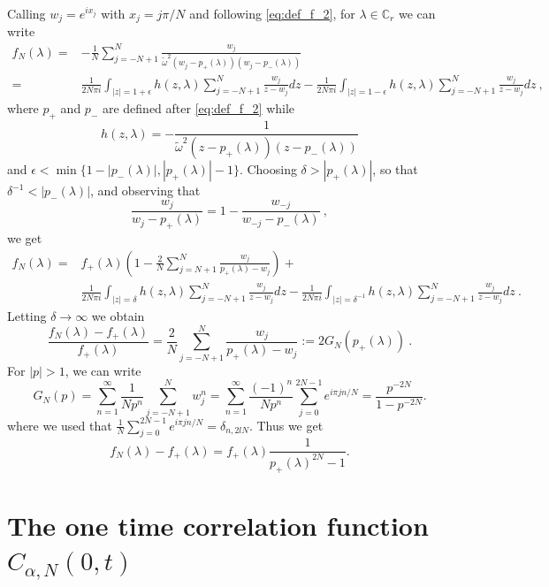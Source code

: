 \documentclass[11pt]{article}
\numberwithin{equation}{section}
\numberwithin{theorem}{section}
\newcommand{\matht}[1]{\texorpdfstring{#1}{}}
\def\tilde#1{\widetilde{#1}}
\begin{document}
Calling $w_j=e^{ix_j}$ with $x_j=j\pi/N$ and following \eqref{eq:def_f_2}, for $\lambda\in\mathds C_r$ we can write
\[
\begin{aligned}
f_N(\lambda)=&-\frac{1}{N}\sum_{j=-N+1}^N
\frac{w_j}{\tilde \omega^2(w_j-p_+(\lambda))(w_j-p_-(\lambda))}\\
=&\frac 1{2N\pi i}\int_{|z|=1+\epsilon}h(z,\lambda)\sum_{j=-N+1}^N
\frac{w_j}{z-w_j}dz-\frac 1{2 N \pi
i}\int_{|z|=1-\epsilon}h(z,\lambda)\sum_{j=-N+1}^N
\frac{w_j}{z-w_j}dz\ ,
\end{aligned}
\]
where $p_+$ and $p_-$ are defined after \eqref{eq:def_f_2} while
\[
h(z,\lambda)=-\frac{1}{\tilde \omega^2(z-p_+(\lambda))(z-p_-(\lambda))}
\]
and $\epsilon<\min\{1-|p_-(\lambda)|,|p_+(\lambda)|-1\}$. Choosing $\delta>|p_+(\lambda)|$, so that
$\delta^{-1}<|p_-(\lambda)|$, and observing that
\[
  \frac{w_j}{w_j-p_+(\lambda)} =1-\frac{w_{-j}}{w_{-j}-p_-(\lambda)
  }\ ,
\]
we get
\[
 \begin{aligned}
 f_N(\lambda)=&f_+(\lambda)\left(1 -
\frac 2N\sum_{j=N+1}^N \frac{w_j}{p_+(\lambda) - w_j }
\right )+\\
&\frac 1{2N\pi i}\int_{|z|=\delta}h(z,\lambda)\sum_{j=-N+1}^N
\frac{w_j}{z-w_j}dz-
\frac 1{2N\pi i}\int_{|z|=\delta^{-1}}h(z,\lambda)\sum_{j=-N+1}^N
\frac{w_j}{z-w_j}dz\ .
\end{aligned}
\]
Letting $\delta\to\infty$ we obtain
\[
\frac{ f_N(\lambda)-f_+(\lambda)}{f_+(\lambda)}=\frac {2}N\sum_{j=-N+1}^N
\frac{w_j}{p_+(\lambda)-w_j}:= 2G_N(p_+(\lambda))\ .
\]
For $|p|>1$, we can write
\begin{equation}\label{eq:fourier}
 G_N(p)=\sum_{n=1}^\infty\frac1{Np^n}\sum_{j=-N+1}^N
w_j^n=\sum_{n=1}^\infty\frac{(-1)^n}{Np^n}\sum_{j=0}^{2N-1}e^{i\pi jn/N}=
\frac{p^{-2N}}{1-p^{-2N}}.
\end{equation}
where we used that $\frac 1N\sum_{j=0}^{2N-1}e^{i\pi jn/N}=\delta_{n,2lN}$. Thus we get
\begin{equation}\label{eq:approssimazione_f}
f_N(\lambda)-f_+(\lambda)=
f_+(\lambda)\frac{1}{p_+(\lambda)^{2N}-1}.
\end{equation}



\section{The one time correlation function \matht{$C_{\alpha,N}(0,t)$}}\label{sec:decay1}
\end{document}
